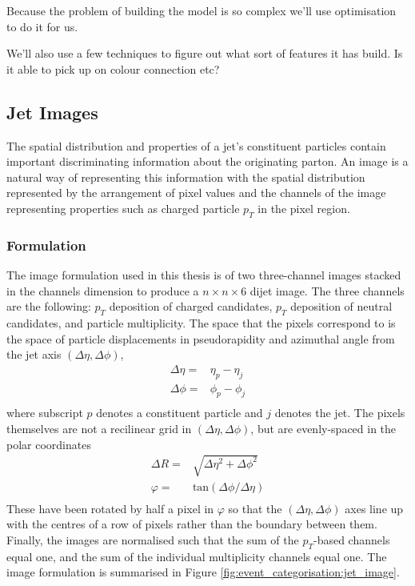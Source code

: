 Because the problem of building the model is so complex we'll use optimisation to do it for us. 

We'll also use a few techniques to figure out what sort of features it has build. Is it able to pick up on colour connection etc?





\subsection{Jet Images}
The spatial distribution and properties of a jet's constituent particles contain important discriminating information about the originating parton. 
An image is a natural way of representing this information with the spatial distribution represented by the arrangement of pixel values and the channels of the image representing properties such as charged particle $p_{T}$ in the pixel region.

\subsubsection{Formulation}
The image formulation used in this thesis is of two three-channel images stacked in the channels dimension to produce a $n\times{}n\times{}6$ dijet image.
The three channels are the following: $p_T$ deposition of charged candidates, $p_T$ deposition of neutral candidates, and particle multiplicity.
The space that the pixels correspond to is the space of particle displacements in pseudorapidity and azimuthal angle from the jet axis $(\Delta\eta,\Delta\phi)$,
\begin{equation}
    \begin{split}
        \Delta\eta =& \eta_{p} - \eta_{j} \\ 
        \Delta\phi =& \phi_{p} - \phi_{j} \\
    \end{split}
    \label{eq:event_categorisation:pixel_coords}
\end{equation}
where subscript $p$ denotes a constituent particle and $j$ denotes the jet. 
The pixels themselves are not a recilinear grid in $(\Delta\eta,\Delta\phi)$, but are evenly-spaced in the polar coordinates 
\begin{equation}
    \begin{split}
        \Delta{R} =& \sqrt{\Delta\eta^2 + \Delta\phi^2} \\
        \varphi   =& \mathrm{tan}(\Delta\phi/\Delta\eta) \\
    \end{split}
    \label{eq:event_categorisation:pixel_coords}
\end{equation}
These have been rotated by half a pixel in $\varphi$ so that the $(\Delta\eta,\Delta\phi)$ axes line up with the centres of a row of pixels rather than the boundary between them. 
Finally, the images are normalised such that the sum of the $p_T$-based channels equal one, and the sum of the individual multiplicity channels equal one. 
The image formulation is summarised in Figure \ref{fig:event_categorisation:jet_image}.

